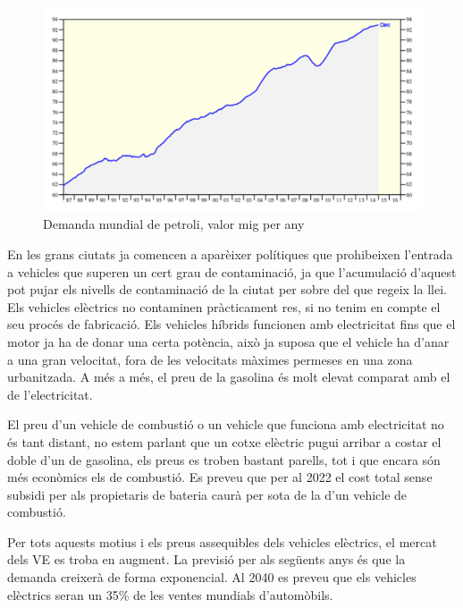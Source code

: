 \begin{figure}[H]
		\centering
    	\includegraphics[width=\textwidth]{Marcteoric/Augmentdemandapetroli.png}
     	\caption{Demanda mundial de petroli, valor mig per any}
\end{figure}

En les grans ciutats ja comencen a aparèixer polítiques que prohibeixen l'entrada a vehicles que superen un cert grau de contaminació, ja que l'acumulació d'aquest pot pujar els nivells de contaminació de la ciutat per sobre del que regeix la llei. Els vehicles elèctrics no contaminen \newline pràcticament res, si no tenim en compte el seu procés de fabricació. Els vehicles híbrids funcionen amb electricitat fins que el motor ja ha de donar una certa potència, això ja suposa que el vehicle ha d'anar a una gran velocitat, fora de les velocitats màximes permeses en una zona urbanitzada. A més a més, el preu de la gasolina és molt elevat comparat amb el de l'electricitat. 

El preu d'un vehicle de combustió o un vehicle que funciona amb electricitat no és tant distant, no estem parlant que un cotxe elèctric pugui arribar a costar el doble d'un de gasolina, els preus es troben bastant parells, tot i que encara són més econòmics els de combustió. Es preveu que per al 2022 el cost total sense subsidi per als propietaris de bateria caurà per sota de la d'un vehicle de combustió. 

Per tots aquests motius i els preus assequibles dels vehicles elèctrics, el mercat dels VE es troba en augment. La previsió per als següents anys és que la demanda creixerà de forma exponencial. Al 2040 es preveu que els vehicles elèctrics seran un 35\% de les ventes mundials d'automòbils.

